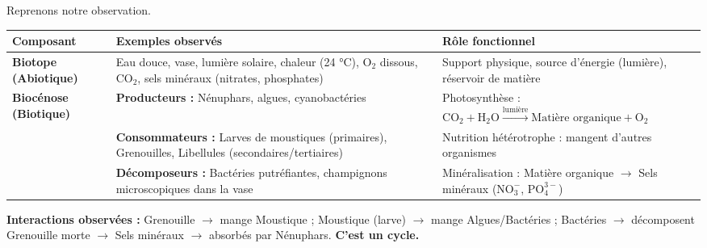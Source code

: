 \documentclass[11pt]{article}
\begin{document}
\begin{exemplebox}
Reprenons notre observation.
\begin{center}
\begin{tabularx}{\linewidth}{|l|X|X|}\hline
\textbf{Composant} & \textbf{Exemples observés} & \textbf{Rôle fonctionnel} \\ \hline
\textbf{Biotope (Abiotique)} & Eau douce, vase, lumière solaire, chaleur (24 °C), $\text{O}_2$ dissous, $\text{CO}_2$, sels minéraux (nitrates, phosphates) & Support physique, source d'énergie (lumière), réservoir de matière \\ \hline
\textbf{Biocénose (Biotique)} & \textbf{Producteurs :} Nénuphars, algues, cyanobactéries & Photosynthèse : $\text{CO}_2 + \text{H}_2\text{O} \xrightarrow{\text{lumière}} \text{Matière organique} + \text{O}_2$ \\ \cline{2-3}
& \textbf{Consommateurs :} Larves de moustiques (primaires), Grenouilles, Libellules (secondaires/tertiaires) & Nutrition hétérotrophe : mangent d'autres organismes \\ \cline{2-3}
& \textbf{Décomposeurs :} Bactéries putréfiantes, champignons microscopiques dans la vase & Minéralisation : Matière organique $\to$ Sels minéraux ($\text{NO}_3^-$, $\text{PO}_4^{3-}$) \\ \hline
\end{tabularx}
\end{center}
\textbf{Interactions observées :} Grenouille $\to$ mange Moustique ; Moustique (larve) $\to$ mange Algues/Bactéries ; Bactéries $\to$ décomposent Grenouille morte $\to$ Sels minéraux $\to$ absorbés par Nénuphars. \textbf{C'est un cycle.}
\end{exemplebox}
\end{document}
